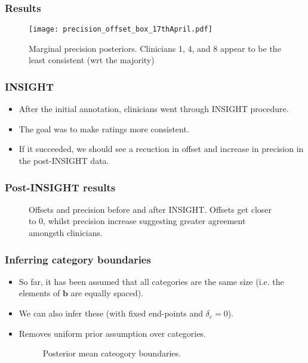 \begin{frame}
	\frametitle{Results}
	\begin{figure}[tbh]
		\centering\texttt{[image: precision\_offset\_box\_17thApril.pdf]}
		\centering\caption{\label{fig:clinicalprecision}Marginal precision posteriors. Clinicians 1, 4, and 8 appear to be the least consistent (wrt the majority)}
	\end{figure}
\end{frame}

\begin{frame}
	\frametitle{INSIGHT}
	\begin{itemize}
		\item After the initial annotation, clinicians went through INSIGHT procedure.
		\item The goal was to make ratings more consistent.
		\item If it succeeded, we should see a recuction in offset and increase in precision in the post-INSIGHT data.
	\end{itemize}
\end{frame}

\begin{frame}
	\frametitle{Post-INSIGHT results}
	\begin{figure}[tbh]
		\hfill
		\centering\caption{\label{fig:clinoffprec}Offsets and precision before and after INSIGHT. Offsets get closer to 0, whilst precision increase suggesting greater agreement amongsth clinicians.}
	\end{figure}
\end{frame}

\begin{frame}
	\frametitle{Inferring category boundaries}
	\begin{itemize}
		\item So far, it has been assumed that all categories are the same size (i.e. the elements of $\mathbf{b}$ are equally spaced).
		\item We can also infer these (with fixed end-points and $\delta_c=0$).
		\item Removes uniform prior assumption over categories.
	\begin{figure}[tbh]
		\hfill
		\centering\caption{\label{fig:clinicalcategories}Posterior mean cateogory boundaries.}
	\end{figure}
	\end{itemize}
\end{frame}

